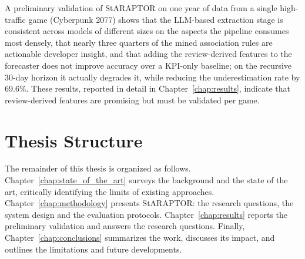 \noindent A preliminary validation of StARAPTOR on one year of data from a single high-traffic game (Cyberpunk 2077) shows that the LLM-based extraction stage is consistent across models of different sizes on the aspects the pipeline consumes most densely, that nearly three quarters of the mined association rules are actionable developer insight, and that adding the review-derived features to the forecaster does not improve accuracy over a KPI-only baseline; on the recursive 30-day horizon it actually degrades it, while reducing the underestimation rate by 69.6\%. These results, reported in detail in Chapter~\ref{chap:results}, indicate that review-derived features are promising but must be validated per game.

\section{Thesis Structure}
\label{sec:thesis_structure}

\noindent The remainder of this thesis is organized as follows. Chapter~\ref{chap:state_of_the_art} surveys the background and the state of the art, critically identifying the limits of existing approaches. Chapter~\ref{chap:methodology} presents StARAPTOR: the research questions, the system design and the evaluation protocols. Chapter~\ref{chap:results} reports the preliminary validation and answers the research questions. Finally, Chapter~\ref{chap:conclusions} summarizes the work, discusses its impact, and outlines the limitations and future developments.

